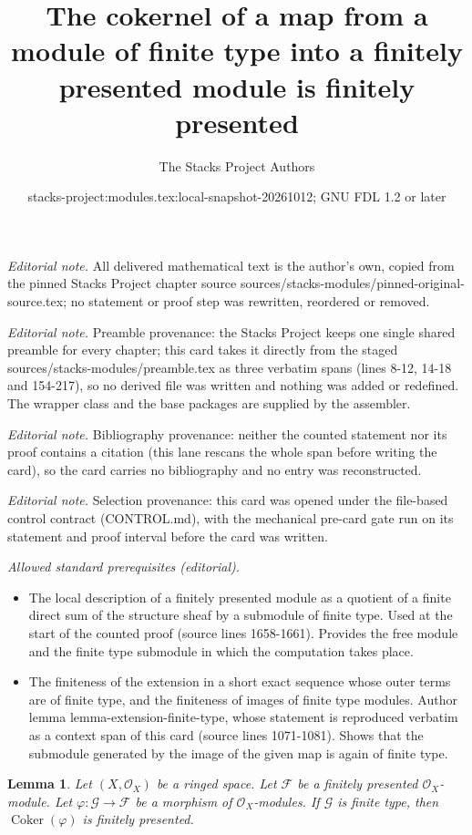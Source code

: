 \documentclass[10pt,a4paper]{amsart}
\title{The cokernel of a map from a module of finite type into a finitely presented module is finitely presented}
\author{The Stacks Project Authors}
\date{stacks-project:modules.tex:local-snapshot-20261012; GNU FDL 1.2 or later}
\theoremstyle{plain}
\newtheorem{lemma}[subsection]{Lemma}
\theoremstyle{definition}
\theoremstyle{remark}
\numberwithin{equation}{subsection}
\def\Coker{\mathop{\mathrm{Coker}}}
\begin{document}
\maketitle
\noindent\textit{Editorial note.} All delivered mathematical text is the author's own, copied from the pinned Stacks Project chapter source sources/stacks-modules/pinned-original-source.tex; no statement or proof step was rewritten, reordered or removed.\par\medskip
\noindent\textit{Editorial note.} Preamble provenance: the Stacks Project keeps one single shared preamble for every chapter; this card takes it directly from the staged sources/stacks-modules/preamble.tex as three verbatim spans (lines 8-12, 14-18 and 154-217), so no derived file was written and nothing was added or redefined. The wrapper class and the base packages are supplied by the assembler.\par\medskip
\noindent\textit{Editorial note.} Bibliography provenance: neither the counted statement nor its proof contains a citation (this lane rescans the whole span before writing the card), so the card carries no bibliography and no entry was reconstructed.\par\medskip
\noindent\textit{Editorial note.} Selection provenance: this card was opened under the file-based control contract (CONTROL.md), with the mechanical pre-card gate run on its statement and proof interval before the card was written.\par\medskip
\noindent\textit{Allowed standard prerequisites (editorial).}\begin{itemize}
\item The local description of a finitely presented module as a quotient of a finite direct sum of the structure sheaf by a submodule of finite type. Used at the start of the counted proof (source lines 1658-1661). Provides the free module and the finite type submodule in which the computation takes place.
\item The finiteness of the extension in a short exact sequence whose outer terms are of finite type, and the finiteness of images of finite type modules. Author lemma lemma-extension-finite-type, whose statement is reproduced verbatim as a context span of this card (source lines 1071-1081). Shows that the submodule generated by the image of the given map is again of finite type.
\end{itemize}\medskip
\begin{lemma}
\label{lemma-cokernel-finite-finite-presentation}
Let $(X,\mathcal{O}_X)$ be a ringed space. Let $\mathcal{F}$ be a
finitely presented $\mathcal{O}_X$-module. Let
$\varphi : \mathcal{G} \to \mathcal{F}$ be a morphism of
$\mathcal{O}_X$-modules. If $\mathcal{G}$ is finite type, then
$\Coker(\varphi)$ is finitely presented.
\end{lemma}
\end{document}
